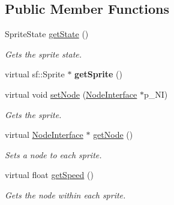 \subsection*{Public Member Functions}
\begin{DoxyCompactItemize}
\item 
\mbox{\label{class_sprite_interface_ad3bcdb5a25c5fe0315c9938a7c8ed395}} 
Sprite\+State \mbox{\hyperlink{class_sprite_interface_ad3bcdb5a25c5fe0315c9938a7c8ed395}{get\+State}} ()
\begin{DoxyCompactList}\small\item\em Gets the sprite state. \end{DoxyCompactList}\item 
\mbox{\label{class_sprite_interface_a548fdaa1e0443386b42326e69702fc13}} 
virtual sf\+::\+Sprite $\ast$ {\bfseries get\+Sprite} ()
\item 
\mbox{\label{class_sprite_interface_aab826769df1222d5dd2ff426c8551bb2}} 
virtual void \mbox{\hyperlink{class_sprite_interface_aab826769df1222d5dd2ff426c8551bb2}{set\+Node}} (\mbox{\hyperlink{class_node_interface}{Node\+Interface}} $\ast$p\+\_\+\+NI)
\begin{DoxyCompactList}\small\item\em Gets the sprite. \end{DoxyCompactList}\item 
virtual \mbox{\hyperlink{class_node_interface}{Node\+Interface}} $\ast$ \mbox{\hyperlink{class_sprite_interface_a0cda548d74975cb3dd3f4d163a1763b6}{get\+Node}} ()
\begin{DoxyCompactList}\small\item\em Sets a node to each sprite. \end{DoxyCompactList}\item 
\mbox{\label{class_sprite_interface_a69b0d3d856aa935d533e2d4ad323235a}} 
virtual float \mbox{\hyperlink{class_sprite_interface_a69b0d3d856aa935d533e2d4ad323235a}{get\+Speed}} ()
\begin{DoxyCompactList}\small\item\em Gets the node within each sprite. \end{DoxyCompactList}\item 
\mbox{\label{class_sprite_interface_a9acb8edb465672a3e55d0b972a20c768}} 

\end{DoxyCompactItemize}
